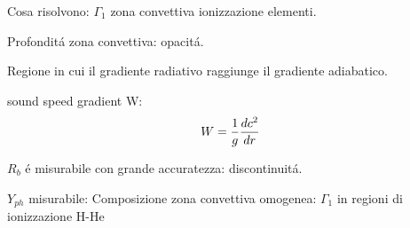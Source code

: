 \documentclass[../main.tex]{subfiles}
\begin{document}
\begin{workout}

Cosa risolvono: $\Gamma_1$ zona convettiva ionizzazione elementi.

\end{workout}

\begin{workout}

Profondit\'a zona convettiva: opacit\'a. 

Regione in cui il gradiente radiativo raggiunge il gradiente adiabatico.

sound speed gradient W:
\begin{equation}
W=\frac{1}{g}\TDy{r}{c^2}
\end{equation}

$R_b$ \'e misurabile con grande accuratezza: discontinuit\'a.

$Y_{ph}$ misurabile: Composizione zona convettiva omogenea:  $\Gamma_1$ in regioni di ionizzazione H-He

\end{workout}
\end{document}
